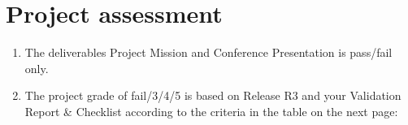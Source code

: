 \documentclass[10pt,a4paper]{article}
\begin{document}
\section{Project assessment}
\begin{enumerate}[noitemsep]
\item The deliverables Project Mission and Conference Presentation is pass/fail only.
\item The project grade of fail/3/4/5 is based on Release R3 and your Validation Report \& Checklist according to the criteria in the table on the next page:

\end{enumerate}

\newpage
\end{document}
